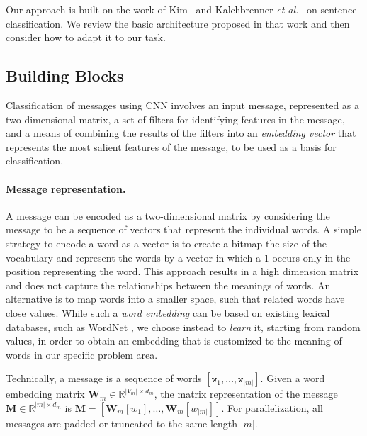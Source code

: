 \documentclass{article}
\newcommand{\jl}[1]{\mynote{Julia}{#1}}
\begin{document}
Our approach is built on the work of Kim~\cite{kim2014convolutional}
and Kalchbrenner {\em et al.}~\cite{kalchbrenner2014convolutional} on
sentence classification.  We review the basic architecture proposed in that
work and then consider how to adapt it to our task.

\subsection{Building Blocks}
\label{sec:blocks}

Classification of messages using CNN involves an input message, represented
as a two-dimensional matrix, a set of filters for identifying features in
the message, and a means of combining the results of the filters into an
{\em embedding vector} that represents the most salient features of the
message, to be used as a basis for classification.

\paragraph*{Message representation.}
A message can be encoded as a two-dimensional matrix by considering the
message to be a sequence of vectors that represent the individual words.  A
simple strategy to encode a word as a vector is to create a bitmap the size
of the vocabulary and represent the words by a vector in which a 1 occurs
only in the position representing the word.  This approach results in a
high dimension matrix and does not capture the relationships between the
meanings of words.  An alternative is to map words into a smaller space,
such that related words have close values.  While such a {\em word
  embedding} can be based on existing lexical databases, such as WordNet
\jl{?} \cite{WordNet}, we choose instead to {\em learn} it, starting from
random values, in order to obtain an embedding that is customized to the
meaning of words in our specific problem area.

Technically, a message is a sequence of words $[\texttt{w}_1, \dots,
  \texttt{w}_{|m|}]$.  Given a word embedding matrix $\textbf{W}_m \in
\mathbb{R}^{|V_m|\times d_m}$, the matrix representation of the message
$\textbf{M} \in \mathbb{R}^{|m| \times d_m}$ is $\textbf{M} =
       [\textbf{W}_m[w_1], \dots, \textbf{W}_m[w_{|m|}]]$.  For
       parallelization, all messages are padded or truncated to the same
       length $|m|$.
\end{document}
